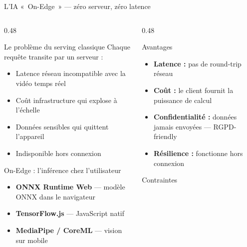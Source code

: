 \documentclass[aspectratio=169, 10pt]{beamer}
\begin{document}
\begin{frame}{L'IA «~On-Edge~» --- zéro serveur, zéro latence}
  \begin{columns}[T]
    \begin{column}{0.48\textwidth}
      \begin{alertblock}{Le problème du serving classique}
        Chaque requête transite par un serveur :
        \begin{itemize}
          \item Latence réseau incompatible avec la vidéo temps réel
          \item Coût infrastructure qui explose à l'échelle
          \item Données sensibles qui quittent l'appareil
          \item Indisponible hors connexion
        \end{itemize}
      \end{alertblock}
      \vspace{4pt}
      \begin{exampleblock}{On-Edge : l'inférence chez l'utilisateur}
        \begin{itemize}
          \item \textbf{ONNX Runtime Web} --- modèle ONNX dans le navigateur
          \item \textbf{TensorFlow.js} --- JavaScript natif
          \item \textbf{MediaPipe / CoreML} --- vision sur mobile
        \end{itemize}
      \end{exampleblock}
    \end{column}
    \begin{column}{0.48\textwidth}
      \begin{block}{Avantages}
        \begin{itemize}\setlength{\itemsep}{1pt}
          \item \textbf{Latence :} pas de round-trip réseau
          \item \textbf{Coût :} le client fournit la puissance de calcul
          \item \textbf{Confidentialité :} données jamais envoyées --- RGPD-friendly
          \item \textbf{Résilience :} fonctionne hors connexion
        \end{itemize}
      \end{block}
      \vspace{2pt}
      \begin{alertblock}{Contraintes}

\end{alertblock}
\end{column}
\end{columns}
\end{frame}
\end{document}

